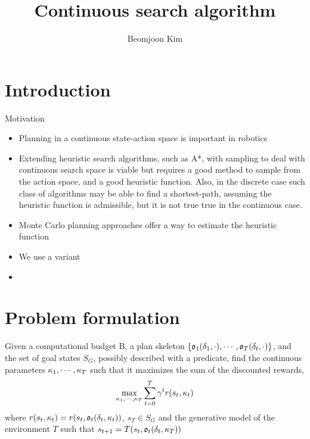 \documentclass[10pt,letterpaper]{article}
\author{Beomjoon Kim}
\title{Continuous search algorithm}
\begin{document}
\maketitle
\section{Introduction}
Motivation
\begin{itemize}
\item Planning in a continuous state-action space is important in robotics
\item Extending heuristic search algorithms, such as A*, with sampling
to deal with continuous search space is viable but requires
a good method to sample from the action space, and a good heuristic
function. Also, in the discrete case such class of algorithms may
be able to find a shortest-path, assuming the heuristic function
is admissible, but it is not true true in the continuous case.
\item Monte Carlo planning approaches offer a way to estimate the
heuristic function
\item We use a variant 
\item 
\end{itemize}


\section{Problem formulation}
Given a computational budget B,
a plan skeleton $\{\mathfrak{o}_1(\delta_1,\cdot),\cdots,\mathfrak{o}_T(\delta_t,\cdot)\}$, 
and the set of goal states $S_G$, possibly described with a predicate,
find the continuous parameters $\kappa_1,\cdots,\kappa_T$ such that it maximizes
the sum of the discounted rewards,
$$ \max_{\kappa_1,\cdots,\kappa_T}  \sum_{t=0}^{T
}  \gamma^t r(s_t,\kappa_t)  $$
where $r(s_t,\kappa_t) = r(s_t,\mathfrak{o}_t(\delta_t,\kappa_t) )$, $s_T \in S_G$ and
the generative model of the environment $T$ such that $s_{t+1} = T(s_t,\mathfrak{o}_t(\delta_t,\kappa_T))$







\end{document}
